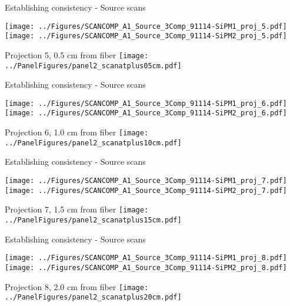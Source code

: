 \documentclass[compress,8pt]{beamer} %
\begin{document}
\begin{frame}{Establishing consistency - Source scans}
\begin{adjustwidth}{-2em}{-2em}
\texttt{[image: ../Figures/SCANCOMP\_A1\_Source\_3Comp\_91114-SiPM1\_proj\_5.pdf]}
\texttt{[image: ../Figures/SCANCOMP\_A1\_Source\_3Comp\_91114-SiPM2\_proj\_5.pdf]}
\end{adjustwidth}
Projection 5, 0.5 cm from fiber
\hfill \texttt{[image: ../PanelFigures/panel2\_scanatplus05cm.pdf]}
\end{frame}

\begin{frame}{Establishing consistency - Source scans}
\begin{adjustwidth}{-2em}{-2em}
\texttt{[image: ../Figures/SCANCOMP\_A1\_Source\_3Comp\_91114-SiPM1\_proj\_6.pdf]}
\texttt{[image: ../Figures/SCANCOMP\_A1\_Source\_3Comp\_91114-SiPM2\_proj\_6.pdf]}
\end{adjustwidth}
Projection 6, 1.0 cm from fiber
\hfill \texttt{[image: ../PanelFigures/panel2\_scanatplus10cm.pdf]}
\end{frame}

\begin{frame}{Establishing consistency - Source scans}
\begin{adjustwidth}{-2em}{-2em}
\texttt{[image: ../Figures/SCANCOMP\_A1\_Source\_3Comp\_91114-SiPM1\_proj\_7.pdf]}
\texttt{[image: ../Figures/SCANCOMP\_A1\_Source\_3Comp\_91114-SiPM2\_proj\_7.pdf]}
\end{adjustwidth}
Projection 7, 1.5 cm from fiber
\hfill \texttt{[image: ../PanelFigures/panel2\_scanatplus15cm.pdf]}
\end{frame}

\begin{frame}{Establishing consistency - Source scans}
\begin{adjustwidth}{-2em}{-2em}
\texttt{[image: ../Figures/SCANCOMP\_A1\_Source\_3Comp\_91114-SiPM1\_proj\_8.pdf]}
\texttt{[image: ../Figures/SCANCOMP\_A1\_Source\_3Comp\_91114-SiPM2\_proj\_8.pdf]}
\end{adjustwidth}
Projection 8, 2.0 cm from fiber
\hfill \texttt{[image: ../PanelFigures/panel2\_scanatplus20cm.pdf]}
\end{frame}
\end{document}

